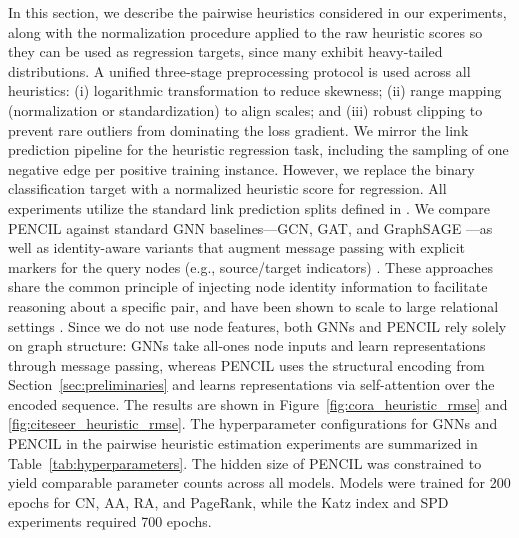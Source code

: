 \documentclass{article}
\theoremstyle{plain}
\theoremstyle{definition}
\theoremstyle{remark}
\begin{document}
In this section, we describe the pairwise heuristics considered in our experiments, along with the normalization procedure applied to the raw heuristic scores so they can be used as regression targets, since many exhibit heavy-tailed distributions. A unified three-stage preprocessing protocol is used across all heuristics: (i) logarithmic transformation to reduce skewness; (ii) range mapping (normalization or standardization) to align scales; and (iii) robust clipping to prevent rare outliers from dominating the loss gradient. We mirror the link prediction pipeline for the heuristic regression task, including the sampling of one negative edge per positive training instance. However, we replace the binary classification target with a normalized heuristic score for regression. All experiments utilize the standard link prediction splits defined in \cite{li_evaluating_2023}. We compare PENCIL against standard GNN baselines---GCN, GAT, and GraphSAGE \cite{kipf2017semisupervised,veličković2018graph,hamilton2017inductive}---as well as identity-aware variants that augment message passing with explicit markers for the query nodes (e.g., source/target indicators) \cite{you2021identity,zhu_neural_bellman-ford_2021,zhang_labeling_2022}. These approaches share the common principle of injecting node identity information to facilitate reasoning about a specific pair, and have been shown to scale to large relational settings \cite{robinson2024relbench,yuan_contextgnn_2025}. Since we do not use node features, both GNNs and PENCIL rely solely on graph structure: GNNs take all-ones node inputs and learn representations through message passing, whereas PENCIL uses the structural encoding from Section~\ref{sec:preliminaries} and learns representations via self-attention over the encoded sequence. The results are shown in Figure~\ref{fig:cora_heuristic_rmse} and \ref{fig:citeseer_heuristic_rmse}. The hyperparameter configurations for GNNs and PENCIL in the pairwise heuristic estimation experiments are summarized in Table~\ref{tab:hyperparameters}. The hidden size of PENCIL was constrained to yield comparable parameter counts across all models. Models were trained for 200 epochs for CN, AA, RA, and PageRank, while the Katz index and SPD experiments required 700 epochs.
\end{document}
